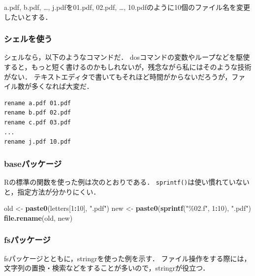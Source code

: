 \documentclass[
]{article}
\newenvironment{Shaded}{\begin{snugshade}}{\end{snugshade}}
\newcommand{\DecValTok}[1]{\textcolor[rgb]{0.00,0.00,0.81}{#1}}
\newcommand{\FunctionTok}[1]{\textcolor[rgb]{0.13,0.29,0.53}{\textbf{#1}}}
\newcommand{\NormalTok}[1]{#1}
\newcommand{\OtherTok}[1]{\textcolor[rgb]{0.56,0.35,0.01}{#1}}
\newcommand{\SpecialCharTok}[1]{\textcolor[rgb]{0.81,0.36,0.00}{\textbf{#1}}}
\newcommand{\StringTok}[1]{\textcolor[rgb]{0.31,0.60,0.02}{#1}}
\begin{document}
a.pdf, b.pdf, \ldots, j.pdfを01.pdf, 02.pdf, \ldots, 10.pdfのように10個のファイル名を変更したいとする．

\hypertarget{ux30b7ux30a7ux30ebux3092ux4f7fux3046}{%
\subsubsection{シェルを使う}\label{ux30b7ux30a7ux30ebux3092ux4f7fux3046}}

シェルなら，以下のようなコマンドだ．
dosコマンドの変数やループなどを駆使すると，もっと短く書けるのかもしれないが，残念ながら私にはそのような技術がない．
テキストエディタで書いてもそれほど時間がからないだろうが，ファイル数が多くなれば大変だ．

\begin{verbatim}
rename a.pdf 01.pdf
rename b.pdf 02.pdf
rename c.pdf 03.pdf
...
rename j.pdf 10.pdf
\end{verbatim}

\hypertarget{baseux30d1ux30c3ux30b1ux30fcux30b8}{%
\subsubsection{baseパッケージ}\label{baseux30d1ux30c3ux30b1ux30fcux30b8}}

Rの標準の関数を使った例は次のとおりである．
\texttt{sprintf()}は使い慣れていないと，指定方法が分かりにくい．

\begin{Shaded}
\begin{Highlighting}[]
\NormalTok{old }\OtherTok{\textless{}{-}} \FunctionTok{paste0}\NormalTok{(letters[}\DecValTok{1}\SpecialCharTok{:}\DecValTok{10}\NormalTok{], }\StringTok{".pdf"}\NormalTok{)}
\NormalTok{new }\OtherTok{\textless{}{-}} \FunctionTok{paste0}\NormalTok{(}\FunctionTok{sprintf}\NormalTok{(}\StringTok{"\%02.f"}\NormalTok{, }\DecValTok{1}\SpecialCharTok{:}\DecValTok{10}\NormalTok{), }\StringTok{".pdf"}\NormalTok{)}
\FunctionTok{file.rename}\NormalTok{(old, new)}
\end{Highlighting}
\end{Shaded}

\hypertarget{fsux30d1ux30c3ux30b1ux30fcux30b8}{%
\subsubsection{fsパッケージ}\label{fsux30d1ux30c3ux30b1ux30fcux30b8}}

fsパッケージとともに，stringrを使った例を示す．
ファイル操作をする際には，文字列の置換・検索などをすることが多いので，stringrが役立つ．
\end{document}
